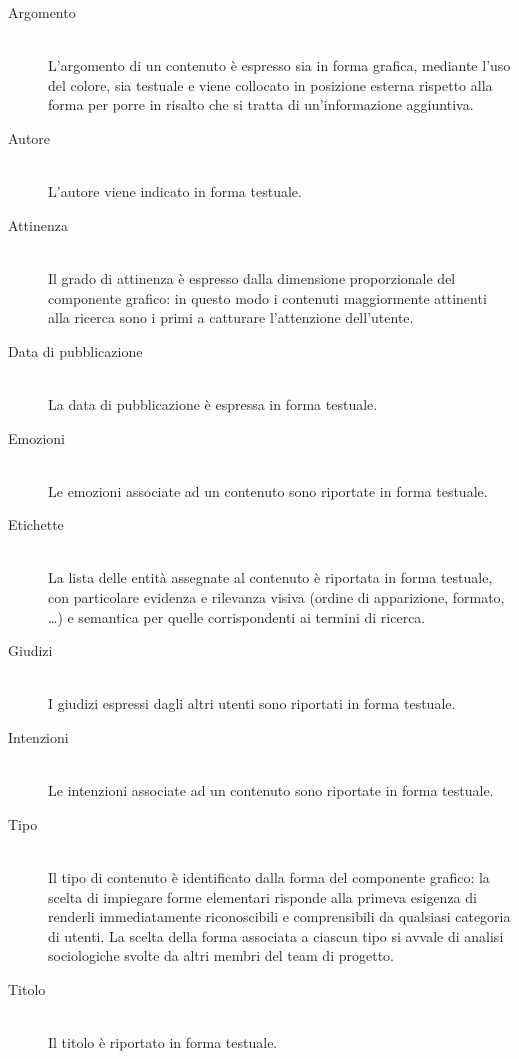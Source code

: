 \begin{description}
\item[Argomento] \hfill \\
L'argomento di un contenuto è espresso sia in forma grafica, mediante l'uso del colore, sia testuale e viene collocato in posizione esterna rispetto alla forma per porre in risalto che si tratta di un'informazione aggiuntiva.
\item[Autore] \hfill \\
L'autore viene indicato in forma testuale.
\item[Attinenza] \hfill \\
Il grado di attinenza è espresso dalla dimensione proporzionale del componente grafico: in questo modo i contenuti maggiormente attinenti alla ricerca sono i primi a catturare l'attenzione dell'utente.
\item[Data di pubblicazione] \hfill \\
La data di pubblicazione è espressa in forma testuale.
\item[Emozioni] \hfill \\
Le emozioni associate ad un contenuto sono riportate in forma testuale.
\item[Etichette] \hfill \\
La lista delle entità assegnate al contenuto è riportata in forma testuale, con particolare evidenza e rilevanza visiva (ordine di apparizione, formato, \ldots) e semantica per quelle corrispondenti ai termini di ricerca.
\item[Giudizi] \hfill \\
I giudizi espressi dagli altri utenti sono riportati in forma testuale.
\item[Intenzioni] \hfill \\
Le intenzioni associate ad un contenuto sono riportate in forma testuale.
\item[Tipo] \hfill \\
Il tipo di contenuto è identificato dalla forma del componente grafico: la scelta di impiegare forme elementari risponde alla primeva esigenza di renderli immediatamente riconoscibili e comprensibili da qualsiasi categoria di utenti. La scelta della forma associata a ciascun tipo si avvale di analisi sociologiche svolte da altri membri del team di progetto.
\item[Titolo] \hfill \\
Il titolo è riportato in forma testuale.
\end{description}

